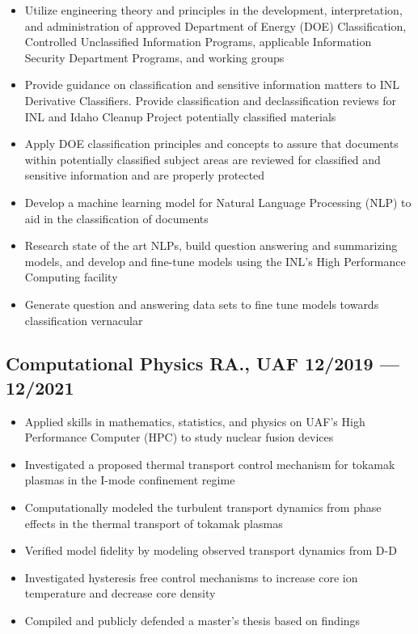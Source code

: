 \documentclass[letterpaper,11pt]{article}
\begin{document}
\begin{itemize}
    \setlength{\itemsep}{-.5pt}
\item  Utilize engineering theory and principles in the development, interpretation, and administration of approved Department of Energy (DOE) Classification, Controlled Unclassified Information Programs, applicable Information
Security Department Programs, and working groups
\item  Provide guidance on classification and sensitive information matters to INL Derivative Classifiers. Provide classification and declassification reviews for INL and Idaho Cleanup Project potentially classified materials
\item  Apply DOE classification principles and concepts to assure that documents within potentially classified subject areas are reviewed for classified and sensitive information and are properly protected
\item  Develop a machine learning model for Natural Language Processing (NLP) to aid in the classification of documents
\item  Research state of the art NLPs, build question answering and summarizing models, and develop and fine-tune models using the INL’s High Performance Computing facility
\item  Generate question and answering data sets to fine tune models towards classification vernacular
\end{itemize}

\subsection*{{\color{cvblue}Computational Physics RA., UAF } \hfill 12/2019 --- 12/2021} 
    \begin{itemize}
    \setlength{\itemsep}{-.5pt}
    \item Applied skills in mathematics, statistics, and physics on UAF's High Performance Computer (HPC) to study nuclear fusion devices  
\item Investigated a proposed thermal transport control mechanism for tokamak plasmas in the I-mode confinement regime 
\item Computationally modeled the turbulent transport dynamics from phase effects in the thermal transport of tokamak plasmas
\item Verified model fidelity by modeling observed transport dynamics from D-D
\item Investigated hysteresis free control mechanisms to increase core ion temperature and decrease core density 
\item Compiled and publicly defended a master's thesis based on findings
    \end{itemize}
\end{document}
